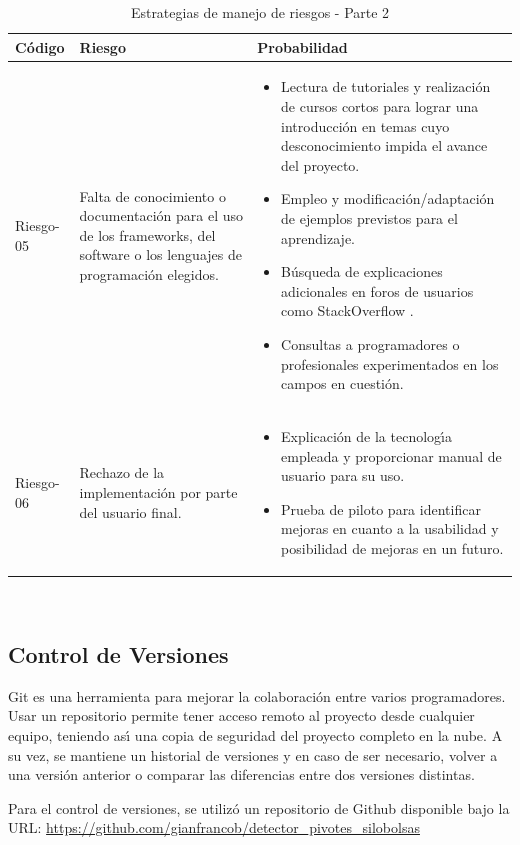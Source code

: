 \begin{table}[h!]
    \begin{tabular}{ | m{1.5cm} | m{5cm}| m{5cm} |}
        \hline
        \textbf{Código} & \textbf{Riesgo} & \textbf{Probabilidad} \\
        \hline
         Riesgo-05 & Falta de conocimiento o documentación para el uso de los frameworks, del software o los lenguajes de programación elegidos.&  \begin{itemize} 
                    \item Lectura de tutoriales y realización de cursos cortos para lograr una introducción en temas cuyo desconocimiento impida el avance del proyecto.
                    \item Empleo y modificación/adaptación de ejemplos previstos para el aprendizaje.
                    \item Búsqueda de explicaciones adicionales en foros de usuarios como StackOverflow \cite{stackoverflow}.
                    \item Consultas a programadores o profesionales experimentados en los campos en cuestión.
                \end{itemize}\\
        \hline
        Riesgo-06 &Rechazo de la implementación por parte del usuario final.  & 
        \begin{itemize} 
            \item Explicación de la tecnologı́a empleada y proporcionar manual de usuario para su uso.
            \item  Prueba de piloto para identificar mejoras en cuanto a la usabilidad y posibilidad de mejoras en un futuro.
                \end{itemize}\\
        \hline
    \end{tabular}\\
    \caption{Estrategias de manejo de riesgos - Parte 2}
    \label{manejoriesgos2}
\end{table}

\newpage
\subsection{Control de Versiones }
Git es una herramienta para mejorar la colaboración entre varios programadores. Usar un repositorio permite tener acceso remoto al proyecto desde cualquier equipo, teniendo ası́ una copia de seguridad del proyecto completo en la nube. A su vez, se mantiene un historial de versiones y en caso de ser necesario, volver a una versión anterior o comparar las diferencias entre dos versiones distintas.

Para el control de versiones, se utilizó un repositorio de Github disponible bajo la URL:  \url{https://github.com/gianfrancob/detector_pivotes_silobolsas}
\newpage
